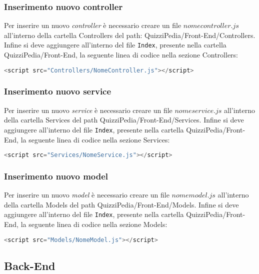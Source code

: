 \subsubsection{Inserimento nuovo controller}  
Per inserire un nuovo \textit{controller} è necessario creare un file $nomecontroller.js$ all'interno della cartella Controllers del path: QuizziPedia/Front-End/Controllers. Infine si deve aggiungere all'interno del file \texttt{Index}, presente nella cartella QuizziPedia/Front-End, la seguente linea di codice nella sezione Controllers:
\begin{lstlisting}[language=Java,firstnumber=1]
	<script src="Controllers/NomeController.js"></script>
\end{lstlisting}

\subsubsection{Inserimento nuovo service}
Per inserire un nuovo \textit{service} è necessario creare un file $nomeservice.js$ all'interno della cartella Services del path QuizziPedia/Front-End/Services. Infine si deve aggiungere all'interno del file \texttt{Index}, presente nella cartella QuizziPedia/Front-End, la seguente linea di codice nella sezione Services:
\begin{lstlisting}[language=Java,firstnumber=1]
	<script src="Services/NomeService.js"></script>
\end{lstlisting}

\subsubsection{Inserimento nuovo model}
Per inserire un nuovo \textit{model} è necessario creare un file $nomemodel.js$ all'interno della cartella Models del path QuizziPedia/Front-End/Models. Infine si deve aggiungere all'interno del file \texttt{Index}, presente nella cartella QuizziPedia/Front-End, la seguente linea di codice nella sezione Models:
\begin{lstlisting}[language=Java,firstnumber=1]
	<script src="Models/NomeModel.js"></script>
\end{lstlisting}


\subsection{Back-End}
